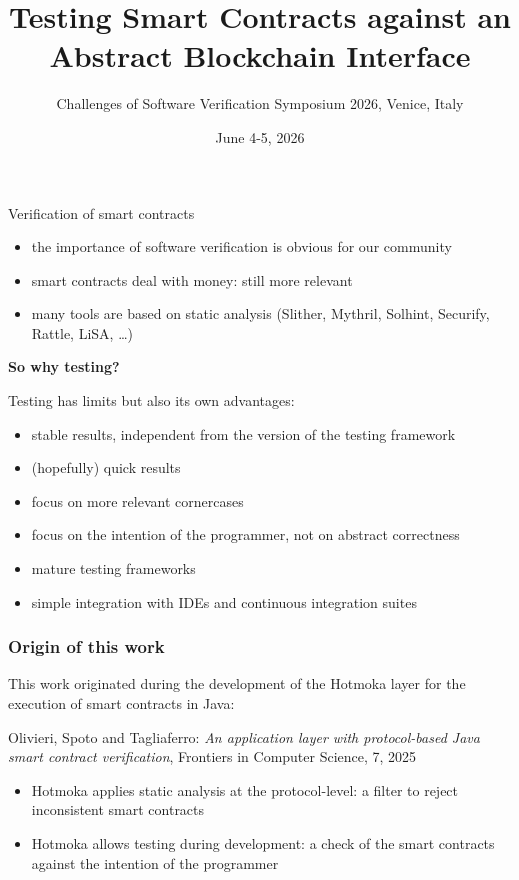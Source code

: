 \documentclass[11pt]{beamer}  %
\subtitle{Challenges of Software Verification Symposium 2026, Venice, Italy}
\title{Testing Smart Contracts against an Abstract Blockchain Interface}
\institute{Universit\`a di Verona, Italy}
\date{June 4-5, 2026}
\begin{document}
\begin{frame}
  \titlepage
\end{frame}

\begin{frame}{Verification of smart contracts}
  \begin{itemize}
  \item the importance of software verification is obvious for our community
  \item smart contracts deal with money: still more relevant
  \item many tools are based on static analysis
    (Slither, Mythril, Solhint, Securify, Rattle, LiSA, \ldots)
  \end{itemize}

  \begin{center}
    \textbf{So why testing?}
  \end{center}

  Testing has limits but also its own advantages:

  \begin{itemize}
  \item stable results, independent from the version of the testing framework
  \item (hopefully) quick results
  \item focus on more relevant cornercases
  \item focus on the intention of the programmer, not on abstract correctness
  \item mature testing frameworks
  \item simple integration with IDEs and continuous integration suites
  \end{itemize}
\end{frame}

\begin{frame}\frametitle{Origin of this work}
  This work originated during the development of the Hotmoka layer for the execution of
  smart contracts in Java:

  \begin{center}
    {\color{red} Olivieri, Spoto and Tagliaferro:
    \emph{An application layer with protocol-based Java smart contract verification},
    Frontiers in Computer Science, 7, 2025}
  \end{center}

  \begin{itemize}
  \item Hotmoka applies static analysis at the protocol-level: a filter to reject
  inconsistent smart contracts

  \item Hotmoka allows testing during development: a check of the
  smart contracts against the intention of the programmer
  \end{itemize}

\end{frame}
\end{document}
